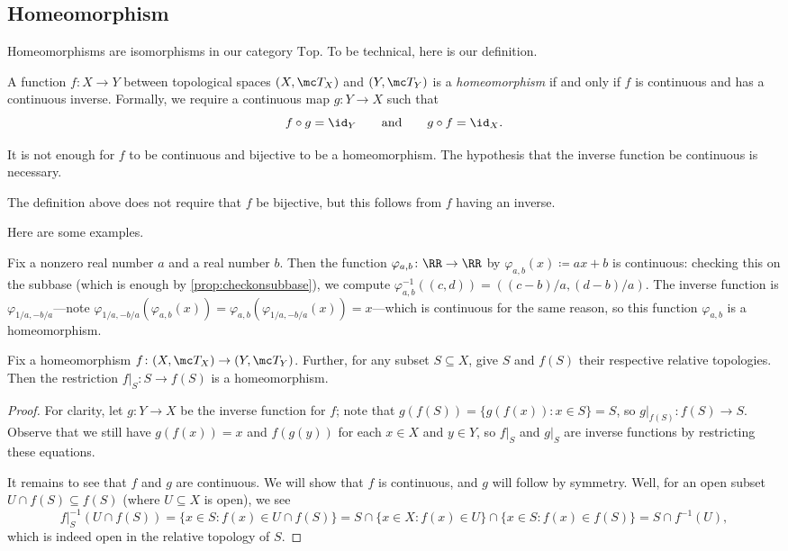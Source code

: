 \documentclass[../notes.tex]{subfiles}
\begin{document}
\subsection{Homeomorphism}
Homeomorphisms are isomorphisms in our category $\mathrm{Top}$. To be technical, here is our definition.
\begin{definition}[Homeomorphism]
	A function $f\colon X\to Y$ between topological spaces $(X,\mc T_X)$ and $(Y,\mc T_Y)$ is a \textit{homeomorphism} if and only if $f$ is continuous and has a continuous inverse. Formally, we require a continuous map $g\colon Y\to X$ such that
	\[f\circ g={\id_Y}\qquad\text{and}\qquad g\circ f={\id_X}.\]
\end{definition}
\begin{warn}
	It is not enough for $f$ to be continuous and bijective to be a homeomorphism. The hypothesis that the inverse function be continuous is necessary.
\end{warn}
\begin{remark}
	The definition above does not require that $f$ be bijective, but this follows from $f$ having an inverse.
\end{remark}
Here are some examples.
\begin{example} \label{ex:lineartransishomeo}
	Fix a nonzero real number $a$ and a real number $b$. Then the function $\varphi_{a,b}\colon\RR\to\RR$ by $\varphi_{a,b}(x)\coloneqq ax+b$ is continuous: checking this on the subbase (which is enough by \autoref{prop:checkonsubbase}), we compute $\varphi_{a,b}^{-1}((c,d))=((c-b)/a,(d-b)/a)$. The inverse function is $\varphi_{1/a,-b/a}$---note $\varphi_{1/a,-b/a}(\varphi_{a,b}(x))=\varphi_{a,b}(\varphi_{1/a,-b/a}(x))=x$---which is continuous for the same reason, so this function $\varphi_{a,b}$ is a homeomorphism.
\end{example}
\begin{lemma} \label{lem:restricthomeo}
	Fix a homeomorphism $f\colon(X,\mc T_X)\to(Y,\mc T_Y)$. Further, for any subset $S\subseteq X$, give $S$ and $f(S)$ their respective relative topologies. Then the restriction $f|_S\colon S\to f(S)$ is a homeomorphism.
\end{lemma}
\begin{proof}
	For clarity, let $g\colon Y\to X$ be the inverse function for $f$; note that $g(f(S))=\{g(f(x)):x\in S\}=S$, so $g|_{f(S)}\colon f(S)\to S$. Observe that we still have $g(f(x))=x$ and $f(g(y))$ for each $x\in X$ and $y\in Y$, so $f|_S$ and $g|_S$ are inverse functions by restricting these equations.

	It remains to see that $f$ and $g$ are continuous. We will show that $f$ is continuous, and $g$ will follow by symmetry. Well, for an open subset $U\cap f(S)\subseteq f(S)$ (where $U\subseteq X$ is open), we see
	\[f|_S^{-1}(U\cap f(S))=\{x\in S:f(x)\in U\cap f(S)\}=S\cap\{x\in X:f(x)\in U\}\cap\{x\in S:f(x)\in f(S)\}=S\cap f^{-1}(U),\]
	which is indeed open in the relative topology of $S$.
\end{proof}
\end{document}
